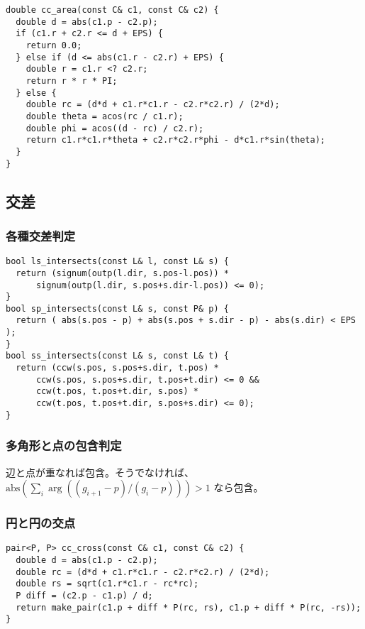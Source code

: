 \begin{lstlisting}
double cc_area(const C& c1, const C& c2) {
  double d = abs(c1.p - c2.p);
  if (c1.r + c2.r <= d + EPS) {
    return 0.0;
  } else if (d <= abs(c1.r - c2.r) + EPS) {
    double r = c1.r <? c2.r;
    return r * r * PI;
  } else {
    double rc = (d*d + c1.r*c1.r - c2.r*c2.r) / (2*d);
    double theta = acos(rc / c1.r);
    double phi = acos((d - rc) / c2.r);
    return c1.r*c1.r*theta + c2.r*c2.r*phi - d*c1.r*sin(theta);
  }
}
\end{lstlisting}



\subsection{交差}


\subsubsection{各種交差判定}

\begin{lstlisting}
bool ls_intersects(const L& l, const L& s) {
  return (signum(outp(l.dir, s.pos-l.pos)) *
      signum(outp(l.dir, s.pos+s.dir-l.pos)) <= 0);
}
bool sp_intersects(const L& s, const P& p) {
  return ( abs(s.pos - p) + abs(s.pos + s.dir - p) - abs(s.dir) < EPS );
}
bool ss_intersects(const L& s, const L& t) {
  return (ccw(s.pos, s.pos+s.dir, t.pos) *
      ccw(s.pos, s.pos+s.dir, t.pos+t.dir) <= 0 &&
      ccw(t.pos, t.pos+t.dir, s.pos) *
      ccw(t.pos, t.pos+t.dir, s.pos+s.dir) <= 0);
}
\end{lstlisting}


\subsubsection{多角形と点の包含判定}

辺と点が重なれば包含。そうでなければ、
$\mathrm{abs}(\sum_i \arg((g_{i+1}-p)/(g_i-p))) > 1$ なら包含。


\subsubsection{円と円の交点}


\begin{lstlisting}
pair<P, P> cc_cross(const C& c1, const C& c2) {
  double d = abs(c1.p - c2.p);
  double rc = (d*d + c1.r*c1.r - c2.r*c2.r) / (2*d);
  double rs = sqrt(c1.r*c1.r - rc*rc);
  P diff = (c2.p - c1.p) / d;
  return make_pair(c1.p + diff * P(rc, rs), c1.p + diff * P(rc, -rs));
}
\end{lstlisting}



